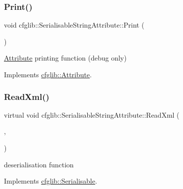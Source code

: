 \subsubsection{\texorpdfstring{Print()}{Print()}}
{\footnotesize\ttfamily void cfglib\+::\+Serialisable\+String\+Attribute\+::\+Print (\begin{DoxyParamCaption}\item[{std\+::ostream \&}]{ }\end{DoxyParamCaption})\hspace{0.3cm}{\ttfamily [virtual]}}

\hyperlink{classcfglib_1_1Attribute}{Attribute} printing function (debug only) 

Implements \hyperlink{classcfglib_1_1Attribute_af8d87ceddde146b92727e61823e0129b}{cfglib\+::\+Attribute}.

\mbox{\label{classcfglib_1_1SerialisableStringAttribute_aa001915e6a54ea8549b4e44da4cade74}} 
\subsubsection{\texorpdfstring{Read\+Xml()}{ReadXml()}}
{\footnotesize\ttfamily virtual void cfglib\+::\+Serialisable\+String\+Attribute\+::\+Read\+Xml (\begin{DoxyParamCaption}\item[{\hyperlink{classXmlTag}{Xml\+Tag} const $\ast$}]{,  }\item[{\hyperlink{classcfglib_1_1Handle}{cfglib\+::\+Handle} \&}]{ }\end{DoxyParamCaption})\hspace{0.3cm}{\ttfamily [virtual]}}

deserialisation function 

Implements \hyperlink{classcfglib_1_1Serialisable_a876d530446317872259356af9b016e13}{cfglib\+::\+Serialisable}.

\mbox{\label{classcfglib_1_1SerialisableStringAttribute_acb99eee7e7ab298a0fc425ca956edd31}} 
